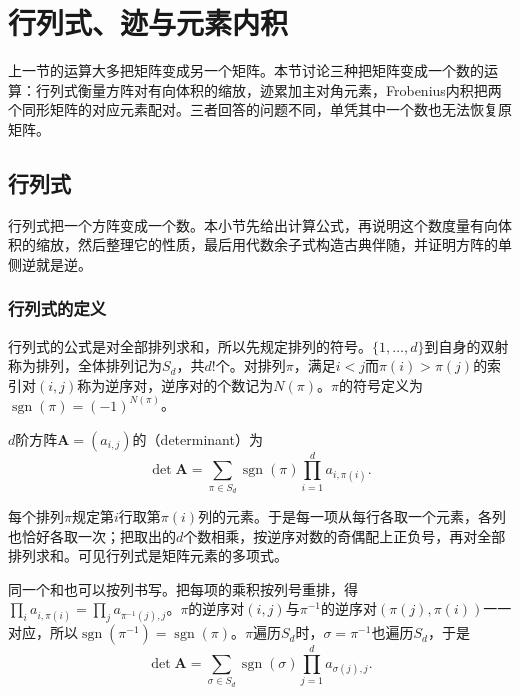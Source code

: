 \section{行列式、迹与元素内积}
\label{sec:ls-matrix-scalar-readouts}

上一节的运算大多把矩阵变成另一个矩阵。本节讨论三种把矩阵变成一个数的运算：行列式衡量方阵对有向体积的缩放，迹累加主对角元素，Frobenius内积把两个同形矩阵的对应元素配对。三者回答的问题不同，单凭其中一个数也无法恢复原矩阵。

\subsection{行列式}
\label{sec:ls-exterior-determinants}
\label{sec:linear-algebra-scalar-readouts}
\label{sec:ls-determinant-properties}
\label{sec:prelim-determinants}

行列式把一个方阵变成一个数。本小节先给出计算公式，再说明这个数度量有向体积的缩放，然后整理它的性质，最后用代数余子式构造古典伴随，并证明方阵的单侧逆就是逆。

\subsubsection{行列式的定义}

行列式的公式是对全部排列求和，所以先规定排列的符号。$\{1,\ldots,d\}$到自身的双射称为排列，全体排列记为$S_d$，共$d!$个。对排列$\pi$，满足$i<j$而$\pi(i)>\pi(j)$的索引对$(i,j)$称为逆序对，逆序对的个数记为$N(\pi)$。$\pi$的符号定义为$\operatorname{sgn}(\pi)=(-1)^{N(\pi)}$。
\begin{definition}[行列式]
\label{def:ls-determinant}
$d$阶方阵$\bm A=(a_{i,j})$的（determinant）为
\[
 \det\bm A
 =\sum_{\pi\in S_d}\operatorname{sgn}(\pi)
   \prod_{i=1}^d a_{i,\pi(i)}.
\]
\end{definition}
每个排列$\pi$规定第$i$行取第$\pi(i)$列的元素。于是每一项从每行各取一个元素，各列也恰好各取一次；把取出的$d$个数相乘，按逆序对数的奇偶配上正负号，再对全部排列求和。可见行列式是矩阵元素的多项式。

同一个和也可以按列书写。把每项的乘积按列号重排，得$\prod_ia_{i,\pi(i)}=\prod_ja_{\pi^{-1}(j),j}$。$\pi$的逆序对$(i,j)$与$\pi^{-1}$的逆序对$(\pi(j),\pi(i))$一一对应，所以$\operatorname{sgn}(\pi^{-1})=\operatorname{sgn}(\pi)$。$\pi$遍历$S_d$时，$\sigma=\pi^{-1}$也遍历$S_d$，于是
\begin{equation}
 \det\bm A=\sum_{\sigma\in S_d}\operatorname{sgn}(\sigma)\prod_{j=1}^d a_{\sigma(j),j}.
 \label{eq:ls-det-column-form}
\end{equation}

